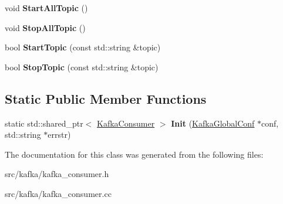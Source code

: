 \begin{DoxyCompactItemize}
\item 
void {\bfseries Start\+All\+Topic} ()\hypertarget{classlog2hdfs_1_1KafkaConsumer_a4c5323c2b8aa7879151f937aa278865c}{}\label{classlog2hdfs_1_1KafkaConsumer_a4c5323c2b8aa7879151f937aa278865c}

\item 
void {\bfseries Stop\+All\+Topic} ()\hypertarget{classlog2hdfs_1_1KafkaConsumer_a8c6fa096dff438222fe5faa8e6534a36}{}\label{classlog2hdfs_1_1KafkaConsumer_a8c6fa096dff438222fe5faa8e6534a36}

\item 
bool {\bfseries Start\+Topic} (const std\+::string \&topic)\hypertarget{classlog2hdfs_1_1KafkaConsumer_a64aaf4d6b6c9b80475a36b7033fbf681}{}\label{classlog2hdfs_1_1KafkaConsumer_a64aaf4d6b6c9b80475a36b7033fbf681}

\item 
bool {\bfseries Stop\+Topic} (const std\+::string \&topic)\hypertarget{classlog2hdfs_1_1KafkaConsumer_a193777bd396d2b3adf4d8f591076b79d}{}\label{classlog2hdfs_1_1KafkaConsumer_a193777bd396d2b3adf4d8f591076b79d}

\end{DoxyCompactItemize}
\subsection*{Static Public Member Functions}
\begin{DoxyCompactItemize}
\item 
static std\+::shared\+\_\+ptr$<$ \hyperlink{classlog2hdfs_1_1KafkaConsumer}{Kafka\+Consumer} $>$ {\bfseries Init} (\hyperlink{classlog2hdfs_1_1KafkaGlobalConf}{Kafka\+Global\+Conf} $\ast$conf, std\+::string $\ast$errstr)\hypertarget{classlog2hdfs_1_1KafkaConsumer_a29cabdb7effeecfa881b0cf90fe84ae1}{}\label{classlog2hdfs_1_1KafkaConsumer_a29cabdb7effeecfa881b0cf90fe84ae1}

\end{DoxyCompactItemize}


The documentation for this class was generated from the following files\+:\begin{DoxyCompactItemize}
\item 
src/kafka/kafka\+\_\+consumer.\+h\item 
src/kafka/kafka\+\_\+consumer.\+cc\end{DoxyCompactItemize}

